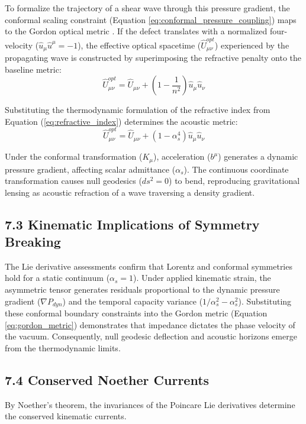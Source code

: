 To formalize the trajectory of a shear wave through this pressure gradient, the conformal scaling constraint (Equation \ref{eq:conformal_pressure_coupling}) maps to the Gordon optical metric \cite{Gordon1923}. If the defect translates with a normalized four-velocity ($\hat{u}_\mu \hat{u}^\mu = -1$), the effective optical spacetime ($\hat{U}^{opt}_{\mu\nu}$) experienced by the propagating wave is constructed by superimposing the refractive penalty onto the baseline metric:
\begin{equation}
    \hat{U}^{opt}_{\mu\nu} = \hat{U}_{\mu\nu} + \left( 1 - \frac{1}{n^2} \right) \hat{u}_\mu \hat{u}_\nu \label{eq:gordon_metric}
\end{equation}

Substituting the thermodynamic formulation of the refractive index from Equation (\ref{eq:refractive_index}) determines the acoustic metric:
\begin{equation}
    \hat{U}^{opt}_{\mu\nu} = \hat{U}_{\mu\nu} + \left( 1 - \alpha_s^4 \right) \hat{u}_\mu \hat{u}_\nu
\end{equation}

Under the conformal transformation ($K_\mu$), acceleration ($b^\mu$) generates a dynamic pressure gradient, affecting scalar admittance ($\alpha_s$). The continuous coordinate transformation causes null geodesics ($ds^2 = 0$) to bend, reproducing gravitational lensing as acoustic refraction of a wave traversing a density gradient.

\subsection*{7.3 Kinematic Implications of Symmetry Breaking}
The Lie derivative assessments confirm that Lorentz and conformal symmetries hold for a static continuum ($\alpha_s = 1$). Under applied kinematic strain, the asymmetric tensor generates residuals proportional to the dynamic pressure gradient ($\nabla P_{dyn}$) and the temporal capacity variance ($1/\alpha_s^2 - \alpha_s^2$). Substituting these conformal boundary constraints into the Gordon metric (Equation \ref{eq:gordon_metric}) demonstrates that impedance dictates the phase velocity of the vacuum. Consequently, null geodesic deflection and acoustic horizons emerge from the thermodynamic limits.

\subsection*{7.4 Conserved Noether Currents}
By Noether's theorem, the invariances of the Poincare Lie derivatives determine the conserved kinematic currents. 

